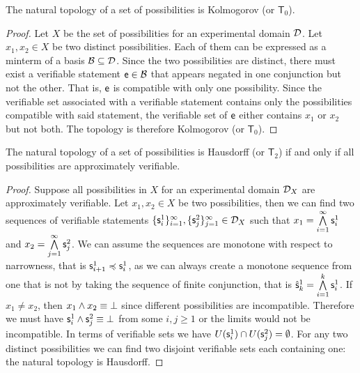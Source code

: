 \documentclass[11pt,letterpaper,fleqn]{memoir} %
\begin{document}
\begin{mathSection}
	\begin{prop}
	The natural topology of a set of possibilities is Kolmogorov (or $\mathsf{T}_0$).
\end{prop}
\begin{proof}
	Let $X$ be the set of possibilities for an experimental domain $\edomain$. Let $x_1, x_2 \in X$ be two distinct possibilities. Each of them can be expressed as a minterm of a basis $\basis \subseteq \edomain$. Since the two possibilities are distinct, there must exist a verifiable statement $\obs[e] \in \basis$ that appears negated in one conjunction but not the other. That is, $\obs[e]$ is compatible with only one possibility. Since the verifiable set associated with a verifiable statement contains only the possibilities compatible with said statement, the verifiable set of $\obs[e]$ either contains $x_1$ or $x_2$ but not both. The topology is therefore Kolmogorov (or $\mathsf{T}_0$).
\end{proof}
	\begin{prop}
	The natural topology of a set of possibilities is Hausdorff (or $\mathsf{T}_2$) if and only if all possibilities are approximately verifiable.
\end{prop}
\begin{proof}
	Suppose all possibilities in $X$ for an experimental domain $\edomain_X$ are approximately verifiable. Let $x_1, x_2 \in X$ be two possibilities, then we can find two sequences of verifiable statements $\{\obs_i^1\}_{i=1}^\infty, \{\obs_j^2\}_{j=1}^\infty \in \edomain_X$ such that $x_1=\bigAND\limits_{i=1}^\infty \obs_i^1$ and $x_2=\bigAND\limits_{j=1}^\infty \obs_j^2$. We can assume the sequences are monotone with respect to narrowness, that is $\obs_{i+1}^1 \narrower \obs_i^1$, as we can always create a monotone sequence from one that is not by taking the sequence of finite conjunction, that is $\hat{\obs}_k^1=\bigAND\limits_{i=1}^k \obs_i^1$. If $x_1 \neq x_2$, then $x_1 \AND x_2 \equiv \contradiction$ since different possibilities are incompatible. Therefore we must have $\obs_i^1 \AND \obs_j^2 \equiv \contradiction$ from some $i,j \geq 1$ or the limits would not be incompatible. In terms of verifiable sets we have $U(\obs_i^1) \cap U(\obs_j^2) = \emptyset$. For any two distinct possibilities we can find two disjoint verifiable sets each containing one: the natural topology is Hausdorff.


\end{proof}
\end{mathSection}
\end{document}
